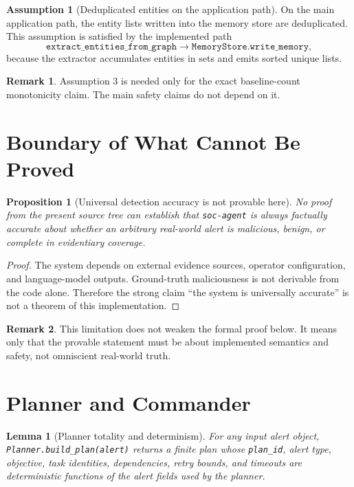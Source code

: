 \documentclass[11pt]{article}
\newtheorem{lemma}{Lemma}
\newtheorem{proposition}{Proposition}
\theoremstyle{definition}
\newtheorem{assumption}{Assumption}
\newtheorem{remark}{Remark}
\begin{document}
\begin{assumption}[Deduplicated entities on the application path]
On the main application path, the entity lists written into the memory store are deduplicated.
This assumption is satisfied by the implemented path
\[
\texttt{extract\_entities\_from\_graph} \rightarrow \texttt{MemoryStore.write\_memory},
\]
because the extractor accumulates entities in sets and emits sorted unique lists.
\end{assumption}

\begin{remark}
Assumption 3 is needed only for the exact baseline-count monotonicity claim. The main safety
claims do not depend on it.
\end{remark}

\section{Boundary of What Cannot Be Proved}
\begin{proposition}[Universal detection accuracy is not provable here]
No proof from the present source tree can establish that \texttt{soc-agent} is always
factually accurate about whether an arbitrary real-world alert is malicious, benign, or
complete in evidentiary coverage.
\end{proposition}

\begin{proof}
The system depends on external evidence sources, operator configuration, and language-model
outputs. Ground-truth maliciousness is not derivable from the code alone. Therefore the
strong claim ``the system is universally accurate'' is not a theorem of this implementation.
\end{proof}

\begin{remark}
This limitation does not weaken the formal proof below. It means only that the provable
statement must be about implemented semantics and safety, not omniscient real-world truth.
\end{remark}

\section{Planner and Commander}
\begin{lemma}[Planner totality and determinism]
For any input alert object, \texttt{Planner.build\_plan(alert)} returns a finite plan whose
\texttt{plan\_id}, alert type, objective, task identities, dependencies, retry bounds, and
timeouts are deterministic functions of the alert fields used by the planner.
\end{lemma}
\end{document}
